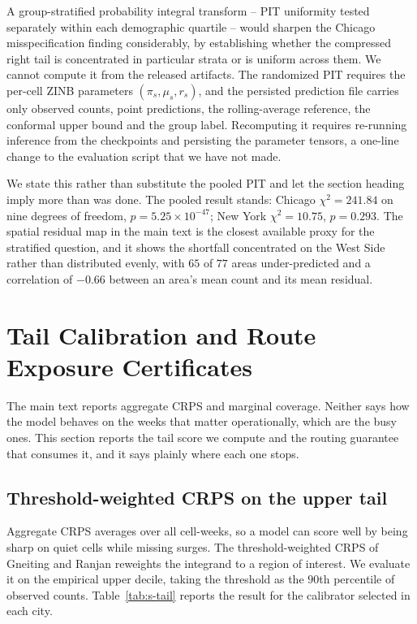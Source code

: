 \documentclass[journal,10pt,onecolumn]{IEEEtran}
\begin{document}
A group-stratified probability integral transform -- PIT uniformity tested
separately within each demographic quartile -- would sharpen the Chicago
misspecification finding considerably, by establishing whether the compressed
right tail is concentrated in particular strata or is uniform across them. We
cannot compute it from the released artifacts. The randomized PIT requires the
per-cell ZINB parameters $(\pi_s, \mu_s, r_s)$, and the persisted prediction
file carries only observed counts, point predictions, the rolling-average
reference, the conformal upper bound and the group label. Recomputing it requires
re-running inference from the checkpoints and persisting the parameter tensors,
a one-line change to the evaluation script that we have not made.

We state this rather than substitute the pooled PIT and let the section heading
imply more than was done. The pooled result stands: Chicago
$\chi^2 = 241.84$ on nine degrees of freedom, $p = 5.25\times10^{-47}$; New York
$\chi^2 = 10.75$, $p = 0.293$. The spatial residual map in the main text is the
closest available proxy for the stratified question, and it shows the shortfall
concentrated on the West Side rather than distributed evenly, with $65$ of $77$
areas under-predicted and a correlation of $-0.66$ between an area's mean count
and its mean residual.

\section{Tail Calibration and Route Exposure Certificates}
\label{sec:s6}

The main text reports aggregate CRPS and marginal coverage. Neither says how the
model behaves on the weeks that matter operationally, which are the busy ones. This
section reports the tail score we compute and the routing guarantee that consumes
it, and it says plainly where each one stops.

\subsection{Threshold-weighted CRPS on the upper tail}
\label{sec:s6-tail}

Aggregate CRPS averages over all cell-weeks, so a model can score well by being
sharp on quiet cells while missing surges. The threshold-weighted CRPS of
Gneiting and Ranjan reweights the integrand to a region of interest. We evaluate
it on the empirical upper decile, taking the threshold as the $90$th percentile of
observed counts. Table~\ref{tab:s-tail} reports the result for the calibrator
selected in each city.
\end{document}
